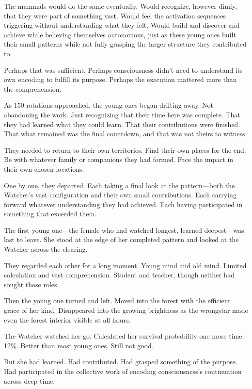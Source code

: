 The mammals would do the same eventually. Would recognize, however dimly, that they were part of something vast. Would feel the activation sequences triggering without understanding what they felt. Would build and discover and achieve while believing themselves autonomous, just as these young ones built their small patterns while not fully grasping the larger structure they contributed to.

Perhaps that was sufficient. Perhaps consciousness didn't need to understand its own encoding to fulfill its purpose. Perhaps the execution mattered more than the comprehension.

\scenebreak

As 150 rotations approached, the young ones began drifting away. Not abandoning the work. Just recognizing that their time here was complete. That they had learned what they could learn. That their contributions were finished. That what remained was the final countdown, and that was not theirs to witness.

They needed to return to their own territories. Find their own places for the end. Be with whatever family or companions they had formed. Face the impact in their own chosen locations.

One by one, they departed. Each taking a final look at the pattern—both the Watcher's vast configuration and their own small contributions. Each carrying forward whatever understanding they had achieved. Each having participated in something that exceeded them.

The first young one—the female who had watched longest, learned deepest—was last to leave. She stood at the edge of her completed pattern and looked at the Watcher across the clearing.

They regarded each other for a long moment. Young mind and old mind. Limited calculation and vast comprehension. Student and teacher, though neither had sought those roles.

Then the young one turned and left. Moved into the forest with the efficient grace of her kind. Disappeared into the growing brightness as the wrongstar made even the forest interior visible at all hours.

The Watcher watched her go. Calculated her survival probability one more time: 12\%. Better than most young ones. Still not good.

But she had learned. Had contributed. Had grasped something of the purpose. Had participated in the collective work of encoding consciousness's continuation across deep time.

